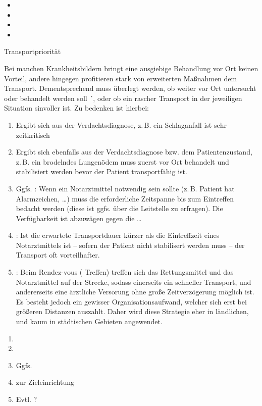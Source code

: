 \documentclass[
ngerman,
paper=a4,
asymmetric,
fontsize=10pt,
headings=small,
draft=false,
numbers=noenddot,
bibtotocnumbered,
footnotes=multiple,
]{scrreprt}
\begin{document}
\begin{itemize}
  \item {}
  \item {}
  \item {}
  \item {}
\end{itemize}


\TextSlide
{Transportpriorität}
{Bei manchen Krankheitsbildern bringt eine ausgiebige
Behandlung vor Ort keinen Vorteil, andere hingegen
profitieren stark von erweiterten Maßnahmen  dem
Transport. Dementsprechend muss überlegt werden, ob weiter
vor Ort untersucht oder behandelt werden soll ´, oder ob ein
rascher Transport in der jeweiligen Situation sinvoller ist.
Zu bedenken ist hierbei:

\begin{enumerate}
  \item {} Ergibt sich aus der
  Verdachtsdiagnose, z.\,B. ein Schlaganfall ist sehr
  zeitkritisch
  \item {} Ergibt sich ebenfalls
  aus der Verdachtsdiagnose bzw. dem Patientenzustand, z.\,B.
  ein brodelndes Lungenödem muss zuerst vor Ort behandelt und stabilisiert werden
  bevor der Patient transportfähig ist.
  \item Ggfs. : Wenn
  ein Notarztmittel notwendig sein sollte (z.\,B. Patient hat
  Alarmzeichen, \ldots) muss die erforderliche Zeitspanne
  bis zum Eintreffen bedacht werden (diese ist ggfs. über
  die Leitstelle zu erfragen). Die Verfügbarkeit ist
  abzuwägen gegen die \ldots
  \item {}: Ist die
  erwartete Transportdauer kürzer als die Eintreffzeit eines
  Notarztmittels ist -- sofern der Patient nicht stabilisert
  werden muss -- der Transport oft vorteilhafter. 
  \item {}: Beim Rendez-vous (
  Treffen) treffen sich das Rettungsmittel und das
  Notarztmittel auf der Strecke, sodass einerseits ein
  schneller Transport, und andererseits eine ärztliche
  Versorung ohne große Zeitverzögerung möglich ist. Es
  besteht jedoch ein gewisser Organisationsaufwand, welcher
  sich erst bei größeren Distanzen auszahlt. Daher wird
  diese Strategie eher in ländlichen, und kaum in
  städtischen Gebieten angewendet.
\end{enumerate}


}
{
\begin{enumerate}
  \item {} 
  \item {} 
  \item Ggfs. 
  \item {} zur Zieleinrichtung
  \item Evtl. ?
\end{enumerate}
}
{}
{}
{}
\end{document}
